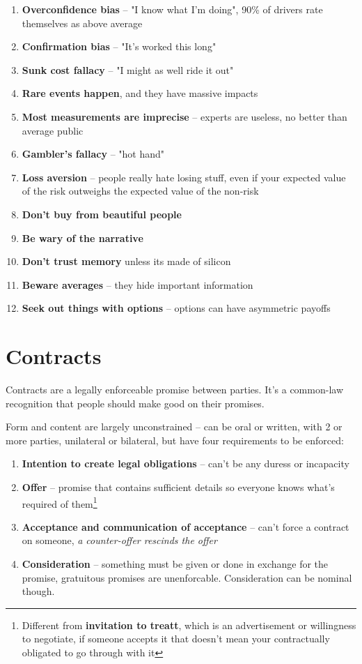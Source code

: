 \documentclass{article}
\begin{document}
\begin{enumerate}
\item \textbf{Overconfidence bias} -- "I know what I'm doing", 90\% of drivers rate themselves as above average
\item \textbf{Confirmation bias} -- "It's worked this long"
\item \textbf{Sunk cost fallacy} -- "I might as well ride it out"
\item \textbf{Rare events happen}, and they have massive impacts
\item \textbf{Most measurements are imprecise}  -- experts are useless, no better than average public
\item \textbf{Gambler's fallacy} -- "hot hand"
\item \textbf{Loss aversion} -- people really hate losing stuff, even if your expected value of the risk outweighs the expected value of the non-risk
\item \textbf{Don't buy from beautiful people} 
\item \textbf{Be wary of the narrative}
\item \textbf{Don't trust memory}  unless its made of silicon
\item \textbf{Beware averages} -- they hide important information
\item \textbf{Seek out things with options} -- options can have asymmetric payoffs
\end{enumerate}

\section{Contracts}

Contracts are a legally enforceable promise between parties. It's a common-law recognition that people should make good on their promises.

Form and content are largely unconstrained -- can be oral or written, with 2 or more parties, unilateral or bilateral, but have four requirements to be enforced: \begin{enumerate}
\item \textbf{Intention to create legal obligations} -- can't be any duress or incapacity
\item \textbf{Offer} -- promise that contains sufficient details so everyone knows what's required of them\footnote{Different from \textbf{invitation to treatt}, which is an advertisement or willingness to negotiate, if someone accepts it that doesn't mean your contractually obligated to go through with it}
\item \textbf{Acceptance and communication of acceptance} -- can't force a contract on someone, \textit{a counter-offer rescinds the offer}
\item \textbf{Consideration} -- something must be given or done in exchange for the promise, gratuitous promises are unenforcable. Consideration can be nominal though.
\end{enumerate}
\end{document}
